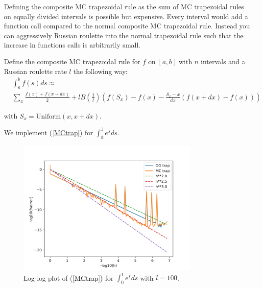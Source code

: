 \documentclass[a4paper,12pt]{article}
\begin{document}
Defining the composite MC trapezoidal rule as
the sum of MC trapezoidal rules on equally divided intervals
is possible but expensive. Every interval would add a function call
compared to the normal composite MC trapezoidal rule. Instead
you can aggressively Russian roulette into the normal trapezoidal rule
such that the increase in functions calls is arbitrarily small.

\begin{definition} \label{MCtrap}
    Define the composite MC trapezoidal rule for $f$ on $[a,b]$ with
    $n$ intervals and a Russian roulette rate $l$ the following way:
    \begin{align}
         & \int_{a}^{b} f(s)ds \approx        \\
         & \sum_{x}  \frac{f(x)+f(x+dx)}{2} +
        l B \left(\frac{1}{l} \right)
        \left(f(S_{x})-f(x)-\frac{S_{x}-x}{dx}(f(x+dx)-f(x)) \right)
    \end{align}

    with $S_{x} = \text{Uniform}(x,x+dx)$.

\end{definition}

\begin{pythonn}
    We implement (\ref{MCtrap}) for $\int_{0}^{1}e^{s}ds$.
    \vspace*{0.5cm}

    \begin{figure}[h!]
        \centering
        \includegraphics[width=0.8\textwidth]{plots/MCtrap.png}
        \caption{Log-log plot of (\ref{MCtrap}) for
        $\int_{0}^{1}e^{s}ds$ with $l=100$.
        }
        \label{fig:MCtrap}
    \end{figure}
\end{pythonn}
\end{document}
